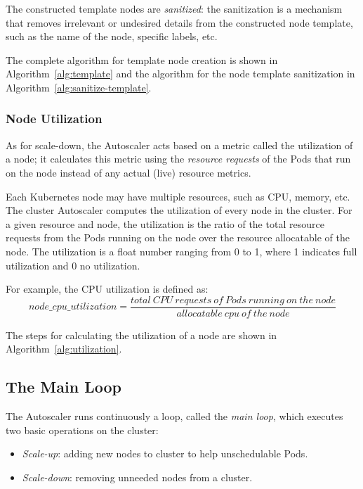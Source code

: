 The constructed template nodes are \textit{sanitized}: the sanitization is a
mechanism that removes irrelevant or undesired details from the constructed node
template, such as the name of the node, specific labels, etc.

The complete algorithm for template node creation is shown in
Algorithm~\ref{alg:template} and the algorithm for the node template
sanitization in Algorithm~\ref{alg:sanitize-template}.


\clearpage


\subsubsection{Node Utilization}

As for scale-down, the Autoscaler acts based on a metric called the utilization
of a node; it calculates this metric using the \emph{resource requests} of the
Pods that run on the node instead of any actual (live) resource metrics.

Each Kubernetes node may have multiple resources, such as CPU, memory, etc. The
cluster Autoscaler computes the utilization of every node in the cluster. For a
given resource and node, the utilization is the ratio of the total resource
requests from the Pods running on the node over the resource allocatable of the
node. The utilization is a float number ranging from 0 to 1, where 1 indicates
full utilization and 0 no utilization.

For example, the CPU utilization is defined as:
\[ node\_cpu\_utilization  =  \frac{total\ CPU\ requests\ of\ Pods\ running\ on\
            the\ node }{ allocatable\ cpu\ of\ the\ node} \]

The steps for calculating the utilization of a node are shown in
Algorithm~\ref{alg:utilization}.





\subsection{The Main Loop}
The Autoscaler runs continuously a loop, called the \textit{main loop}, which
executes two basic operations on the cluster:

\begin{itemize}
      \tightlist
      \item \textit{Scale-up}: adding new nodes to cluster to help unschedulable
            Pods.
      \item \textit{Scale-down}: removing unneeded nodes from a cluster.
\end{itemize}


